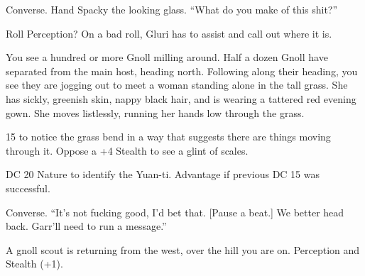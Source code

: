 \begin{multicols}{2}
Converse.
Hand Spacky the looking glass.
``What do you make of this shit?''

Roll Perception?
On a bad roll, Gluri has to assist and call out where it is.

  \begin{aloud}
  You see a hundred or more Gnoll milling around.
  Half a dozen Gnoll have separated from the main host, heading north.
  Following along their heading, you see they are jogging out to meet a woman standing alone
    in the tall grass.
  She has sickly, greenish skin, nappy black hair, and is wearing a tattered red evening gown.
  She moves listlessly, running her hands low through the grass.
  \end{aloud}

15 to notice the grass bend in a way that suggests there are things moving through it.
Oppose a +4 Stealth to see a glint of scales.

DC 20 Nature to identify the Yuan-ti.
Advantage if previous DC 15 was successful.

Converse.
``It's not fucking good, I'd bet that.
[Pause a beat.]
We better head back.
Garr'll need to run a message.''

A gnoll scout is returning from the west, over the hill you are on.
Perception and Stealth (+1).
\end{multicols}

\pagebreak
